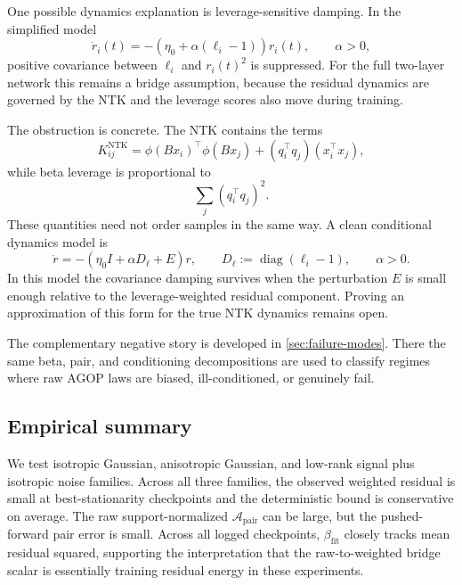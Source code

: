 One possible dynamics explanation is leverage-sensitive damping. In the
simplified model
\[
\dot r_i(t)=-(\eta_0+\alpha(\ell_i-1))r_i(t),
\qquad
\alpha>0,
\]
positive covariance between \(\ell_i\) and \(r_i(t)^2\) is suppressed. For the
full two-layer network this remains a bridge assumption, because the residual
dynamics are governed by the NTK and the leverage scores also move during
training.

The obstruction is concrete. The NTK contains the terms
\[
K^{\mathrm{NTK}}_{ij}
=
\phi(Bx_i)^\top\phi(Bx_j)
+
(q_i^\top q_j)(x_i^\top x_j),
\]
while beta leverage is proportional to
\[
\sum_j(q_i^\top q_j)^2.
\]
These quantities need not order samples in the same way. A clean conditional
dynamics model is
\[
\dot r=-(\eta_0 I+\alpha D_\ell+E)r,
\qquad
D_\ell:=\operatorname{diag}(\ell_i-1),
\qquad
\alpha>0.
\]
In this model the covariance damping survives when the perturbation \(E\) is
small enough relative to the leverage-weighted residual component. Proving an
approximation of this form for the true NTK dynamics remains open.

The complementary negative story is developed in
\autoref{sec:failure-modes}. There the same beta, pair, and conditioning
decompositions are used to classify regimes where raw AGOP laws are biased,
ill-conditioned, or genuinely fail.

\subsection{Empirical summary}

We test isotropic Gaussian, anisotropic Gaussian, and low-rank signal plus
isotropic noise families. Across all three families, the observed weighted
residual is small at best-stationarity checkpoints and the deterministic bound
is conservative on average. The raw support-normalized \(\mathcal A_{\mathrm{pair}}\)
can be large, but the pushed-forward pair error is small. Across all logged
checkpoints, \(\beta_{\mathrm{fit}}\) closely tracks mean residual squared,
supporting the interpretation that the raw-to-weighted bridge scalar is
essentially training residual energy in these experiments.
